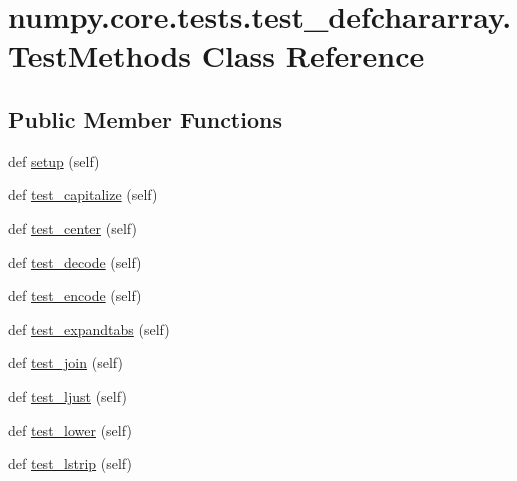 \hypertarget{classnumpy_1_1core_1_1tests_1_1test__defchararray_1_1TestMethods}{}\section{numpy.\+core.\+tests.\+test\+\_\+defchararray.\+Test\+Methods Class Reference}
\label{classnumpy_1_1core_1_1tests_1_1test__defchararray_1_1TestMethods}
\subsection*{Public Member Functions}
\begin{DoxyCompactItemize}
\item 
def \hyperlink{classnumpy_1_1core_1_1tests_1_1test__defchararray_1_1TestMethods_a57b409fc6733ab8985b2bb256f124386}{setup} (self)
\item 
def \hyperlink{classnumpy_1_1core_1_1tests_1_1test__defchararray_1_1TestMethods_a0a33cec90afe614c7614c1819a8fc2f1}{test\+\_\+capitalize} (self)
\item 
def \hyperlink{classnumpy_1_1core_1_1tests_1_1test__defchararray_1_1TestMethods_a3f32de8a1e03da557b04fbdf2e5a1f88}{test\+\_\+center} (self)
\item 
def \hyperlink{classnumpy_1_1core_1_1tests_1_1test__defchararray_1_1TestMethods_a161110bcf22f72cadfdd70b071dd6b59}{test\+\_\+decode} (self)
\item 
def \hyperlink{classnumpy_1_1core_1_1tests_1_1test__defchararray_1_1TestMethods_ac3aeb795d7e182295215833df4d2685f}{test\+\_\+encode} (self)
\item 
def \hyperlink{classnumpy_1_1core_1_1tests_1_1test__defchararray_1_1TestMethods_a36ae317ec5ea1e643d44da1fb6fc0ecf}{test\+\_\+expandtabs} (self)
\item 
def \hyperlink{classnumpy_1_1core_1_1tests_1_1test__defchararray_1_1TestMethods_afc80b22b3075f77d35106e8fd7adf377}{test\+\_\+join} (self)
\item 
def \hyperlink{classnumpy_1_1core_1_1tests_1_1test__defchararray_1_1TestMethods_a3254a0380dbbd15d84a238316b1bf72e}{test\+\_\+ljust} (self)
\item 
def \hyperlink{classnumpy_1_1core_1_1tests_1_1test__defchararray_1_1TestMethods_a682a1c2a75c6a88f3046d25a2f21e6ef}{test\+\_\+lower} (self)
\item 
def \hyperlink{classnumpy_1_1core_1_1tests_1_1test__defchararray_1_1TestMethods_aee75b7bcb02274184c0506b4c880dcee}{test\+\_\+lstrip} (self)

\end{DoxyCompactItemize}

